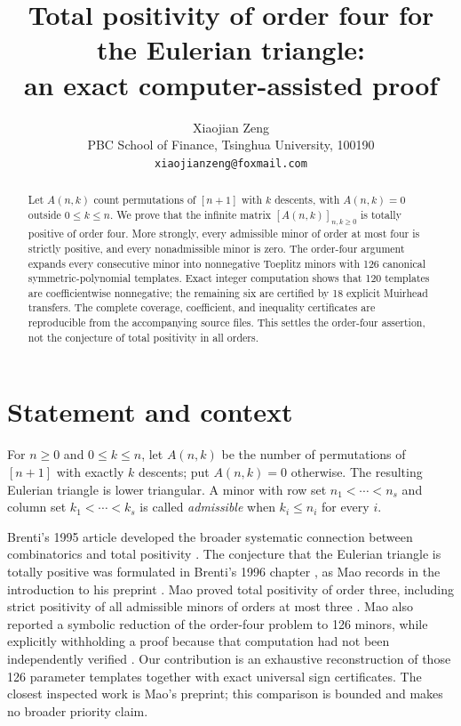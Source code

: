 \documentclass[11pt]{article}
\title{Total positivity of order four for the Eulerian triangle:\\
an exact computer-assisted proof}
\author{Xiaojian Zeng\\
PBC School of Finance, Tsinghua University, 100190\\
\texttt{xiaojianzeng@foxmail.com}}
\date{}
\begin{document}
\maketitle

\begin{abstract}
Let $A(n,k)$ count permutations of $[n+1]$ with $k$ descents, with
$A(n,k)=0$ outside $0\leq k\leq n$.  We prove that the infinite matrix
$[A(n,k)]_{n,k\geq0}$ is totally positive of order four.  More strongly,
every admissible minor of order at most four is strictly positive, and every
nonadmissible minor is zero.  The order-four argument expands every
consecutive minor into nonnegative Toeplitz minors with 126 canonical
symmetric-polynomial templates.  Exact integer computation shows that 120
templates are coefficientwise nonnegative; the remaining six are certified
by 18 explicit Muirhead transfers.  The complete coverage, coefficient, and
inequality certificates are reproducible from the accompanying source files.
This settles the order-four assertion, not the conjecture of total positivity
in all orders.
\end{abstract}

\section{Statement and context}

For $n\geq0$ and $0\leq k\leq n$, let $A(n,k)$ be the number of
permutations of $[n+1]$ with exactly $k$ descents; put $A(n,k)=0$ otherwise.
The resulting Eulerian triangle is lower triangular.  A minor with row set
$n_1<\cdots<n_s$ and column set $k_1<\cdots<k_s$ is called
\emph{admissible} when $k_i\leq n_i$ for every $i$.

Brenti's 1995 article developed the broader systematic connection between
combinatorics and total positivity \cite{Brenti1995}.  The conjecture that the
Eulerian triangle is totally positive was formulated in Brenti's 1996 chapter
\cite[Conjecture~6.10]{Brenti1996}, as Mao records in the introduction to his
preprint \cite[p.~1]{Mao2026}.  Mao proved total positivity of order three,
including strict positivity of all admissible minors of orders at most three
\cite[Theorem~1.1]{Mao2026}.  Mao also reported a symbolic reduction of the
order-four problem to 126 minors, while explicitly withholding a proof because
that computation had not been independently verified
\cite[Remark~1.2]{Mao2026}.  Our contribution is an exhaustive reconstruction
of those 126 parameter templates together with exact universal sign
certificates.  The closest inspected work is Mao's preprint; this comparison is
bounded and makes no broader priority claim.
\end{document}
